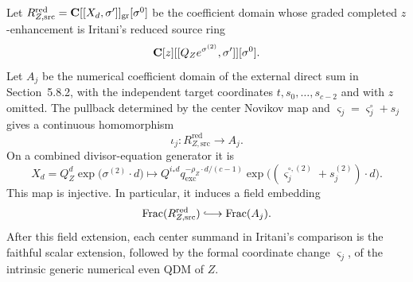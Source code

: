 \begin{lemma}
\label{lem:faithful-center-base-change}
%
%
Let \(R_{Z,\mathrm{src}}^{\mathrm{red}}
=\mathbf C[[X_d,\sigma']]_{\mathrm{gr}}[\sigma^0]\) be the coefficient domain
whose graded completed \(z\)-enhancement is Iritani's reduced source ring
\[\mathbf C[z][[Q_Ze^{\sigma^{(2)}},\sigma']][\sigma^0].\]
Let \(A_j\) be the
numerical coefficient domain of the external direct sum in Section~5.8.2,
with the independent target coordinates \(t,s_0,\ldots,s_{c-2}\) and with
\(z\) omitted.  The pullback determined by the center Novikov map and
\(\varsigma_j=\varsigma_j^\circ+s_j\) gives a continuous homomorphism
\[
 \iota_j:R_{Z,\mathrm{src}}^{\mathrm{red}}\longrightarrow A_j.
\]
On a combined divisor-equation generator it is
\begin{equation}
 X_d=Q_Z^d\exp\!\bigl(\sigma^{(2)}\cdot d\bigr)
 \longmapsto
 Q^{i_*d}q_{\mathrm{exc}}^{-\rho_Z\cdot d/(c-1)}
 \exp\!\bigl((\varsigma_j^{\circ,(2)}+s_j^{(2)})\cdot d\bigr).
 \label{eq:faithful-center-map}
\end{equation}
This map is injective.  In particular, it induces a field embedding
\[
 \operatorname{Frac}(R_{Z,\mathrm{src}}^{\mathrm{red}})
 \lhook\joinrel\longrightarrow
 \operatorname{Frac}(A_j).
\]
After this field extension, each center summand in Iritani's comparison is the
faithful scalar extension, followed by the formal coordinate change
\(\varsigma_j\), of the intrinsic generic numerical even QDM of \(Z\).
\end{lemma}

